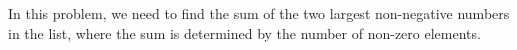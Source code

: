 \documentclass[preview]{standalone}
\begin{document}
In this problem, we need to find the sum of the two largest non-negative numbers in the list, where the sum is determined by the number of non-zero elements.\\
\end{document}
